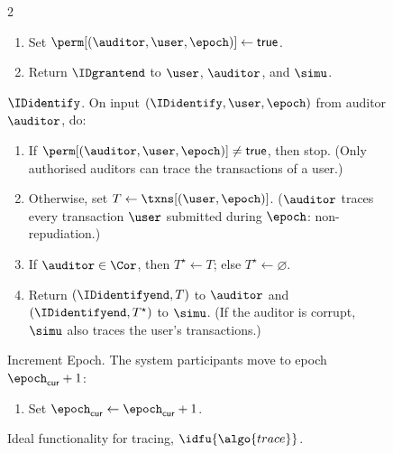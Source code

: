 \begin{figure}
\begin{minipage}{1.1\textwidth}
\begin{framed}
\begin{multicols}{2}
\begin{enumerate}
\begin{enumerate}
              \item Set $\perm[(\auditor,\user,\epoch)] \leftarrow
                \mathsf{true}$.

              \item Return $\IDgrantend$ to $\user$, $\auditor$, and $\simu$.

            \end{enumerate}

        \end{enumerate}

        {$\IDidentify$.} On input $(\IDidentify, \user, \epoch)$ from auditor
        $\auditor$, do:

        \begin{enumerate}

          \item If $\perm[(\auditor,\user,\epoch)] \neq \mathsf{true}$, then
            stop. (Only authorised auditors can trace the transactions of a
            user.)

          \item Otherwise, set $T \leftarrow \txns[(\user,\epoch)]$.
            ($\auditor$ traces every transaction $\user$ submitted during
            $\epoch$: non-repudiation.)

          \item If $\auditor \in \Cor$, then $T^\star \leftarrow T$; else
            $T^\star \leftarrow \varnothing$.

          \item Return $(\IDidentifyend, T)$ to $\auditor$ and
            $(\IDidentifyend, T^\star)$ to $\simu$. (If the auditor is corrupt,
            $\simu$ also traces the user's transactions.)

        \end{enumerate}

        {Increment Epoch.} The system participants move to epoch
        $\epoch_{\mathsf{cur}} + 1$:

        \begin{enumerate}

          \item Set $\epoch_{\mathsf{cur}} \leftarrow \epoch_{\mathsf{cur}} +
            1$.

        \end{enumerate}

      \end{multicols} \end{framed}

    \caption{Ideal functionality for tracing, $\idfu{\algo{trace}}$.}
  \label{fig:ftxid} \end{minipage} \end{figure}
